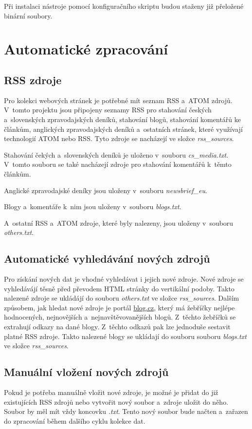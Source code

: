 Při instalaci nástroje pomocí konfiguračního skriptu budou staženy již přeložené binární
soubory.

\section{Automatické zpracování}

\subsection{RSS zdroje}
Pro kolekci webových stránek je potřebné mít seznam RSS a~ATOM zdrojů. V~tomto projektu
jsou připojeny seznamy RSS pro stahování českých a~slovenských zpravodajských deníků, stahování blogů,
stahování komentářů ke článkům, anglických zpravodajských deníků a~ostatních stránek, které využívají
technologií ATOM nebo RSS. Tyto zdroje se nacházejí ve složce \textit{rss\_sources}.

Stahování čekých a~slovenských deníků je uloženo v~souboru \textit{cs\_media.txt}. V~tomto souboru
se také nacházejí zdroje pro stahování komentářů k~těmto článkům.

Anglické zpravodajské deníky jsou uloženy v~souboru \textit{newsbrief\_eu}.

Blogy a~komentáře k~nim jsou uloženy v~souboru \textit{blogs.txt}.

A~ostatní RSS a~ATOM zdroje, které byly nalezeny, jsou uloženy v~souboru \textit{others.txt}.

\subsection{Automatické vyhledávání nových zdrojů}
Pro získání nových dat je vhodné vyhledávat i jejich nové zdroje. Nové zdroje se vyhledávájí
těsně před převodem HTML stránky do vertikální podoby. Takto nalezené zdroje se ukládájí do souboru \textit{others.txt}
ve složce \textit{rss\_sources}.
Dalším způsobem, jak hledat nové zdroje je portál \href{http://blog.cz/}{blog.cz}, který má žebříčky
nejlépe hodnocených, nejnovějších a~nejnavštěvovanějších blogů. Z~těchto žebříčků se extrahují odkazy
na dané blogy. Z~těchto odkazů pak lze jednoduše sestavit platné RSS zdroje. Takto nalezené blogy
se ukládají do souboru souboru \textit{blogs.txt} ve složce \textit{rss\_sources}.

\subsection{Manuální vložení nových zdrojů}
Pokud je potřeba manuálně vložit nové zdroje, je možné je přidat do již existujících
RSS zdrojů nebo vytvořit nový soubor a~zdroje uložit do něho. Soubor by měl mít vždy koncovku
\textit{.txt}. Tento nový soubor bude načten a~zařazen do zpracování během dalšího cyklu kolekce dat.

